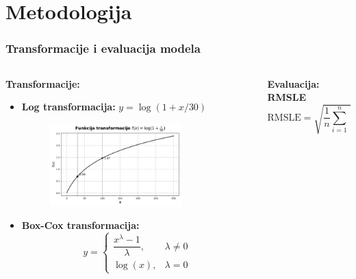 \section{Metodologija}

\begin{frame}
    \frametitle{Transformacije i evaluacija modela}

    \begin{columns}[T, totalwidth=\textwidth]

        \begin{column}{0.48\textwidth}
            \textbf{Transformacije:}

            \begin{itemize}
                \item \textbf{Log transformacija:} $y = \log(1 + x/30)$
                \begin{figure}
                    \centering
                    \includegraphics[width=0.75\textwidth]{images/log1p.png}
                \end{figure}

                \item \textbf{Box-Cox transformacija:} 
                {\small
                \[
                y = 
                \begin{cases} 
                \dfrac{x^\lambda - 1}{\lambda}, & \lambda \neq 0 \\
                \log(x), & \lambda = 0
                \end{cases}
                \]
                }
            \end{itemize}
        \end{column}

        \begin{column}{0.48\textwidth}
            \textbf{Evaluacija: RMSLE}
            {\small
            \[
            \text{RMSLE} = \sqrt{\frac{1}{n}\sum_{i=1}^n \left( \log(1 + \hat{y}_i/30) - \log(1 + y_i/30) \right)^2}
            \]
            }


\end{column}
\end{columns}
\end{frame}
